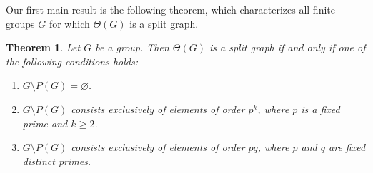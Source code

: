 \documentclass{amsart}
\theoremstyle{plain}
\newtheorem{theorem}{Theorem}[section]
\theoremstyle{definition}
\begin{document}
Our first main result is the following theorem, which characterizes all finite groups $G$ for which $\Theta(G)$ is a split graph.

\begin{theorem}\label{th_complete-split-grph-class}
Let $G$ be a group. Then $\Theta(G)$ is a split graph if and only if one of the following conditions holds:
	\begin{enumerate}
		\item[\rm(i)] $G\setminus P(G) = \varnothing$.
		\item[\rm(ii)] $G\setminus P(G)$ consists exclusively of elements of order $p^k$, where $p$ is a fixed prime and $k\geq 2$.
		\item[\rm(iii)]  $G\setminus P(G)$ consists exclusively of elements of order $pq$, where $p$ and $q$ are fixed distinct primes. 
		\end{enumerate}
\end{theorem}
\end{document}
